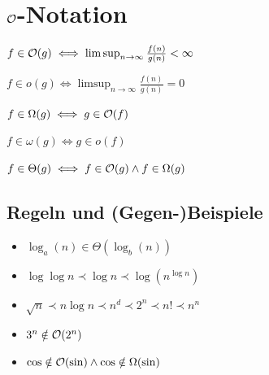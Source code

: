 \section*{$\mathcal{O}$-Notation}
$f \in\mathcal{O}(g) \iff \limsup_{n\to\infty}\frac{f(n)}{g(n)} < \infty$

$f \in o(g) \iff \limsup_{n\to\infty}\frac{f(n)}{g(n)} = 0$

$f \in\Omega(g) \iff g \in \mathcal{O}(f)$

$f \in \omega(g) \iff g\in o(f)$

$f \in \Theta(g) \iff f\in\mathcal{O}(g) \land f \in\Omega(g)$

\subsection*{Regeln und (Gegen-)Beispiele}
\begin{itemize}
	\item $\log_a(n) \in \Theta(\log_b(n))$
	\item $\log\log n \prec \log n \prec \log(n^{\log n})$
	\item $\sqrt{n} \prec n\log n \prec n^d \prec 2^n \prec n! \prec n^n$
	\item $3^n \notin \mathcal{O}(2^n)$
	\item $\cos \notin \mathcal{O}(\sin) \land \cos \notin \Omega(\sin)$
\end{itemize}
